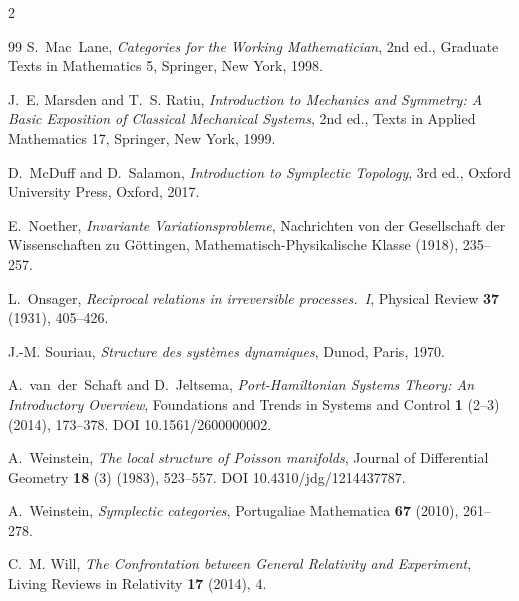 \documentclass[10pt,a4paper]{article}
\theoremstyle{plain}
\theoremstyle{definition}
\begin{document}
{\begin{multicols}{2}
\begin{thebibliography}{99}
 S.~Mac~Lane, \emph{Categories for the Working Mathematician}, 2nd ed., Graduate Texts in Mathematics 5, Springer, New York, 1998.

 J.~E. Marsden and T.~S. Ratiu, \emph{Introduction to Mechanics and Symmetry: A Basic Exposition of Classical Mechanical Systems}, 2nd ed., Texts in Applied Mathematics 17, Springer, New York, 1999.

 D.~McDuff and D.~Salamon, \emph{Introduction to Symplectic Topology}, 3rd ed., Oxford University Press, Oxford, 2017.

 E.~Noether, \emph{Invariante Variationsprobleme}, Nachrichten von der Gesellschaft der Wissenschaften zu G\"ottingen, Mathematisch-Physikalische Klasse (1918), 235--257.

 L.~Onsager, \emph{Reciprocal relations in irreversible processes.\ I}, Physical Review \textbf{37} (1931), 405--426.

 J.-M. Souriau, \emph{Structure des syst\`emes dynamiques}, Dunod, Paris, 1970.

 A.~van~der~Schaft and D.~Jeltsema, \emph{Port-Hamiltonian Systems Theory: An Introductory Overview}, Foundations and Trends in Systems and Control \textbf{1} (2--3) (2014), 173--378. DOI 10.1561/2600000002.

 A.~Weinstein, \emph{The local structure of Poisson manifolds}, Journal of Differential Geometry \textbf{18} (3) (1983), 523--557. DOI 10.4310/jdg/1214437787.

 A.~Weinstein, \emph{Symplectic categories}, Portugaliae Mathematica \textbf{67} (2010), 261--278.

 C.~M. Will, \emph{The Confrontation between General Relativity and Experiment}, Living Reviews in Relativity \textbf{17} (2014), 4.

\end{thebibliography}
\end{multicols}
}
\end{document}
